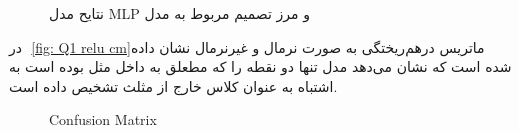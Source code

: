 \documentclass{article}
\begin{document}
\begin{figure}[H] 
	\centering
\caption{نتایح مدل MLP و مرز تصمیم مربوط به مدل}
\end{figure}


در ‎ \autoref{fig: Q1 relu cm}‎ماتریس درهم‌ریختگی به صورت نرمال و غیرنرمال نشان داده شده است که نشان می‌دهد مدل تنها دو نقطه را که مطعلق به داخل مثل بوده است به اشتباه به عنوان کلاس خارج از مثلث تشخیص داده است.
\begin{figure}[H] 
	\centering
	\caption{Confusion Matrix}
	\label{fig: Q1 relu cm}
\end{figure}
\end{document}
